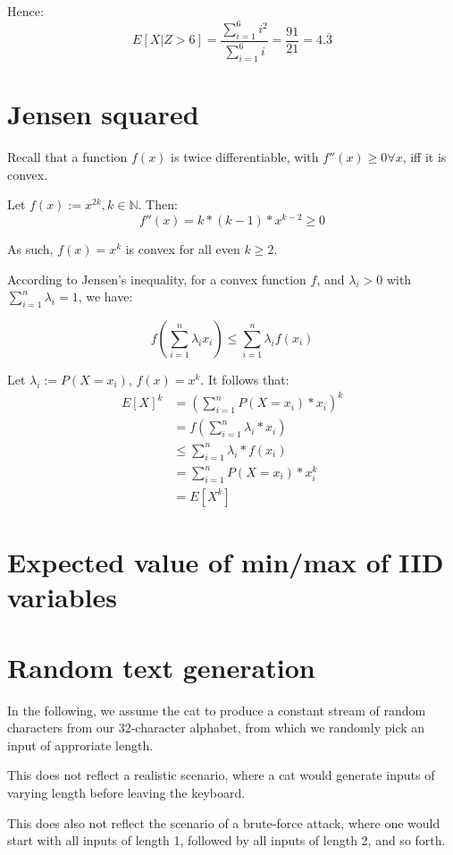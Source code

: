 \documentclass[a4paper]{scrreprt}
\begin{document}
Hence:
\[
	E[X | Z > 6] = \frac{\sum_{i=1}^6{i^2}}{\sum_{i=1}^6{i}} = \frac{91}{21} = 4.\overline{3}
\]

\section{Jensen squared}

Recall that a function $f(x)$ is twice differentiable, with $f''(x) \geq 0
\forall x$, iff it is convex.

Let $f(x) := x^{2k}, k \in \mathbb{N}$. Then:
\[
	f''(x) = k * (k-1) * x^{k-2} \geq 0
\]

As such, $f(x) = x^k$ is convex for all even $k \geq 2$.

According to Jensen's inequality, for a convex function $f$, and $\lambda_i >
0$ with $\sum_{i=1}^n \lambda_i = 1$, we have:

\[
	f(\sum_{i=1}^n{\lambda_i x_i}) \leq \sum_{i=1}^n{\lambda_i f(x_i)}
\]

Let $\lambda_i := P(X = x_i)$, $f(x) = x^k$. It follows that:
\begin{align*}
	E[X]^k & = (\sum_{i=1}^n{P(X=x_i) * x_i})^k \\
	& = f(\sum_{i=1}^n{\lambda_i * x_i}) \\
	& \leq \sum_{i=1}^n{\lambda_i * f(x_i)} \\
	& = \sum_{i=1}^n{P(X=x_i) * x_i^k} \\
	& = E[X^k]
\end{align*}

\section{Expected value of min/max of IID variables}

\section{Random text generation}

In the following, we assume the cat to produce a constant stream of random
characters from our 32-character alphabet, from which we randomly pick an input
of approriate length.

This does not reflect a realistic scenario, where a cat would generate inputs
of varying length before leaving the keyboard.

This does also not reflect the scenario of a brute-force attack, where one
would start with all inputs of length 1, followed by all inputs of length 2,
and so forth.
\end{document}
